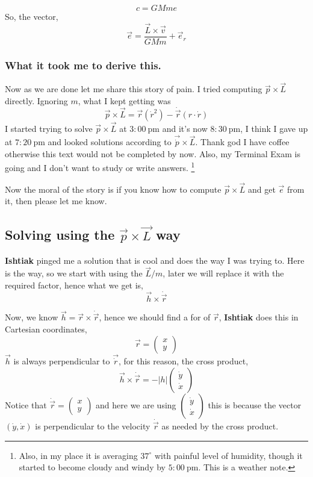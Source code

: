 \documentclass[11pt,a4paper]{article}
\begin{document}
 \[ 
 c = G M m e 
 \]
So, the vector,
\[ 
\boxed{\vec{e} = \frac{\vec{L} \times  \vec{v}         }{GM m   } + \vec{e}_r}
\]

\subsubsection{ What it took me to derive this. }
Now as we are done let me share this story of pain. I tried computing $\vec{p} \times \vec{L}$ directly. Ignoring $m$, what I kept getting was
\[ 
    \vec{p}\times \vec{L} = \vec{r} \left( \dot{r}^2 \right) - \dot{\vec{r}} \left( r \cdot \dot{r} \right) 
\]
I started trying to solve $\vec{p} \times  \vec{L}$ at $3:00 \ \text{pm}$ and it's now $8:30 \ \text{pm}$, I think I gave up at $7:20 \ \text{pm}$ and looked solutions according to $\vec{\dot{  p}} \times  \vec{L}$. Thank god I have coffee otherwise this text would not be completed by now. Also, my Terminal Exam is going and I don't want to study or write answers. \footnote{Also, in my place it is averaging $37^{\circ}$ with painful level of humidity, though it started to become cloudy and windy by $5:00 \ \text{pm}$. This is a weather note.}   

Now the moral of the story is if you know how to compute $\vec{p} \times  \vec{L}$ and get $\vec{e}$ from it, then please let me know. 



\subsection{ Solving using the $\vec{p} \times  \vec{L}$ way}
\textbf{Ishtiak} pinged me a solution that is cool and does the way I was trying to. Here is the way, so we start with using the $\vec{L}/m$, later we will replace it with the required factor,
hence what we get is,
\[ 
    \vec{h} \times  \dot{\vec{r}} 
\]

Now, we know $\vec{h}= \vec{r} \times  \dot{\vec{r}}$, hence we should find a for of $\vec{r}$, \textbf{Ishtiak} does this in Cartesian coordinates,
\[ 
\vec{r} = \begin{pmatrix}
x \\ y 
\end{pmatrix}   
\]
$\vec{h}$ is always perpendicular to $\vec{ \dot{r}} $, for this reason, the cross product,
\[ 
\vec{h} \times  \dot{\vec{r}} = - | h | \begin{pmatrix}
\dot{y}\\ \dot{x} 
\end{pmatrix} 
\]
Notice that $ \dot{\vec{r}} = \begin{pmatrix}
x \\ y 
\end{pmatrix} 
$ and here we are using $ \begin{pmatrix}
\dot{y} \\ \dot{ x} 
\end{pmatrix} 
$ this is because the vector $\left( \dot{y}, \dot{x} \right) $ is perpendicular to the velocity $ \dot{\vec{r}}$ as needed by the cross product. 
\end{document}
